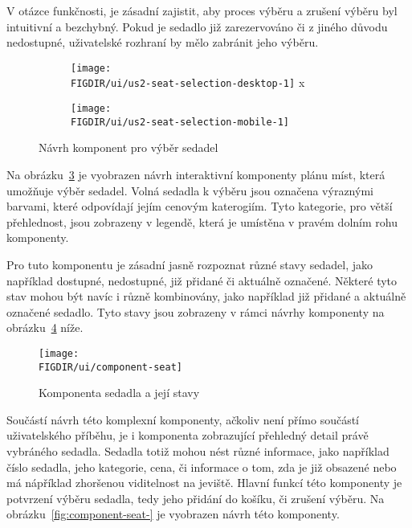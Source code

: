 V otázce funkčnosti, je zásadní zajistit, aby proces výběru a zrušení výběru byl intuitivní a bezchybný.
Pokud je sedadlo již zarezervováno či z jiného důvodu nedostupné, uživatelské rozhraní by mělo zabránit jeho výběru.

\begin{figure}[H]
    \centering
    \begin{subfigure}{0.775\textwidth}
        \texttt{[image: \\FIGDIR/ui/us2-seat-selection-desktop-1]}
        \label{fig:us2-seat-selection-desktop-1}x
    \end{subfigure}
    \begin{subfigure}{0.2\textwidth}
        \texttt{[image: \\FIGDIR/ui/us2-seat-selection-mobile-1]}
        \label{fig:us2-seat-selection-mobile-1}
    \end{subfigure}
    \caption{Návrh komponent pro výběr sedadel}
    \label{fig:us2-seat-selection}
\end{figure}

Na obrázku~\ref{fig:us2-seat-selection} je vyobrazen návrh interaktivní komponenty plánu míst, která umožňuje výběr sedadel.
Volná sedadla k výběru jsou označena výraznými barvami, které odpovídají jejím cenovým katerogiím.
Tyto kategorie, pro větší přehlednost, jsou zobrazeny v legendě, která je umístěna v pravém dolním rohu komponenty.

Pro tuto komponentu je zásadní jasně rozpoznat různé stavy sedadel, jako například dostupné, nedostupné, již přidané či aktuálně označené.
Některé tyto stav mohou být navíc i různě kombinovány, jako například již přidané a aktuálně označené sedadlo.
Tyto stavy jsou zobrazeny v rámci návrhy komponenty  na obrázku~\ref{fig:component-seat} níže.

\begin{figure}[H]
    \centering
        \texttt{[image: \\FIGDIR/ui/component-seat]}
    \caption{Komponenta sedadla a její stavy}
    \label{fig:component-seat}
\end{figure}

Součástí návrh této komplexní komponenty, ačkoliv není přímo součástí uživatelského příběhu, je i komponenta zobrazující přehledný detail právě vybráného sedadla.
Sedadla totiž mohou nést různé informace, jako například číslo sedadla, jeho kategorie, cena, či informace o tom, zda je již obsazené nebo má nápříklad zhoršenou viditelnost na jeviště.
Hlavní funkcí této komponenty je potvrzení výběru sedadla, tedy jeho přidání do košíku, či zrušení výběru.
Na obrázku~\ref{fig:component-seat-} je vyobrazen návrh této komponenty.

